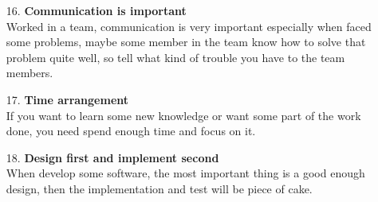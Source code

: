 \documentclass[11pt,a4paper]{amsart}
\begin{document}
\begin{enumerate}
\item[16.]\textbf{Communication is important} \\Worked in a team, communication is very important especially when faced some problems, maybe some member in the team know how to solve that problem quite well, so tell what kind of trouble you have to the team members.

\item[17.]\textbf{Time arrangement} \\ If you want to learn some new knowledge or want some part of the work done, you need spend enough time and focus on it.

\item[18.] \textbf{Design first and implement second} \\ When develop some software, the most important thing is a good enough design, then the implementation and test will be piece of cake. 



\end{enumerate}
\end{document}
